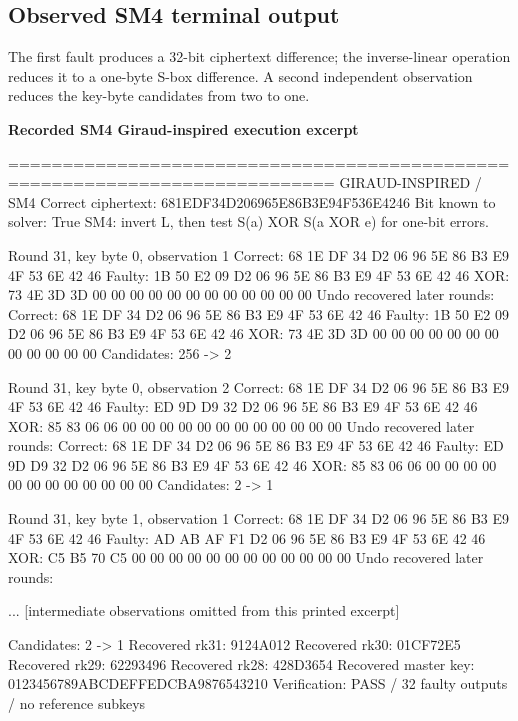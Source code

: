 \subsection{Observed SM4 terminal output}
The first fault produces a 32-bit ciphertext difference; the inverse-linear operation reduces it to a one-byte S-box difference. A second independent observation reduces the key-byte candidates from two to one.
\par\smallskip\noindent\textbf{Recorded SM4 Giraud-inspired execution excerpt}\par
\begin{lightcode}

============================================================================
GIRAUD-INSPIRED / SM4
Correct ciphertext: 681EDF34D206965E86B3E94F536E4246
Bit known to solver: True
SM4: invert L, then test S(a) XOR S(a XOR e) for one-bit errors.

Round 31, key byte 0, observation 1
Correct: 68 1E DF 34 D2 06 96 5E 86 B3 E9 4F 53 6E 42 46
Faulty:  1B 50 E2 09 D2 06 96 5E 86 B3 E9 4F 53 6E 42 46
XOR:     73 4E 3D 3D 00 00 00 00 00 00 00 00 00 00 00 00
Undo recovered later rounds: {}
Correct: 68 1E DF 34 D2 06 96 5E 86 B3 E9 4F 53 6E 42 46
Faulty:  1B 50 E2 09 D2 06 96 5E 86 B3 E9 4F 53 6E 42 46
XOR:     73 4E 3D 3D 00 00 00 00 00 00 00 00 00 00 00 00
Candidates: 256 -> 2

Round 31, key byte 0, observation 2
Correct: 68 1E DF 34 D2 06 96 5E 86 B3 E9 4F 53 6E 42 46
Faulty:  ED 9D D9 32 D2 06 96 5E 86 B3 E9 4F 53 6E 42 46
XOR:     85 83 06 06 00 00 00 00 00 00 00 00 00 00 00 00
Undo recovered later rounds: {}
Correct: 68 1E DF 34 D2 06 96 5E 86 B3 E9 4F 53 6E 42 46
Faulty:  ED 9D D9 32 D2 06 96 5E 86 B3 E9 4F 53 6E 42 46
XOR:     85 83 06 06 00 00 00 00 00 00 00 00 00 00 00 00
Candidates: 2 -> 1

Round 31, key byte 1, observation 1
Correct: 68 1E DF 34 D2 06 96 5E 86 B3 E9 4F 53 6E 42 46
Faulty:  AD AB AF F1 D2 06 96 5E 86 B3 E9 4F 53 6E 42 46
XOR:     C5 B5 70 C5 00 00 00 00 00 00 00 00 00 00 00 00
Undo recovered later rounds: {}

... [intermediate observations omitted from this printed excerpt]

Candidates: 2 -> 1
Recovered rk31: 9124A012
Recovered rk30: 01CF72E5
Recovered rk29: 62293496
Recovered rk28: 428D3654
Recovered master key: 0123456789ABCDEFFEDCBA9876543210
Verification: PASS / 32 faulty outputs / no reference subkeys
\end{lightcode}

